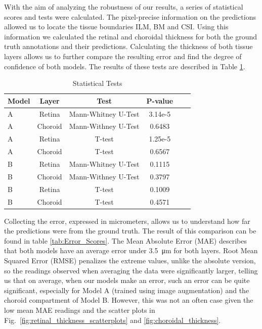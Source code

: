 \documentclass[12pt,a4paper]{scrartcl}
\begin{document}
With the aim of analyzing the robustness of our results, a series of statistical scores and tests were calculated. The pixel-precise information on the predictions allowed us to locate the tissue boundaries ILM, BM and CSI. Using this information we calculated the retinal and choroidal thickness for both the ground truth annotations and their predictions. Calculating the thickness of both tissue layers allows us to further compare the resulting error and find the degree of confidence of both models. The results of these tests are described in Table \ref{tab:statistical_tests}.
\begin{table}[H]
    \begin{tabular}{l c|c|c|c|c}
         \textbf{Model} &\textbf{Layer} & \textbf{Test}& \textbf{P-value}  \\
         \hline
         A & Retina & Mann-Whitney U-Test & 3.14e-5 \\
         A & Choroid & Mann-Withney U-Test & 0.6483 \\
         A & Retina & T-test & 1.25e-5 \\
         A & Choroid & T-test & 0.6567 \\
         B & Retina & Mann-Whitney U-Test & 0.1115 \\
         B & Choroid & Mann-Withney U-Test & 0.3797 \\
         B & Retina & T-test & 0.1009 \\
         B & Choroid & T-test & 0.4571
    \end{tabular}
    \caption{Statistical Tests}
    \label{tab:statistical_tests}
\end{table}

Collecting the error, expressed in micrometers, allows us to understand how far the predictions were from the ground truth. The result of this comparison can be found in table \ref{tab:Error_Scores}. The Mean Absolute Error (MAE) describes that both models have an average error under \SI{3.5}{\micro\metre} for both layers. Root Mean Squared Error (RMSE) penalizes the extreme values, unlike the absolute version, so the readings observed when averaging the data were significantly larger, telling us that on average, when our models make an error, such an error can be quite significant, especially for Model A (trained using image augmentation) and the choroid compartment of Model B. However, this was not an often case given the low mean MAE readings and the scatter plots in Fig.~\ref{fig:retinal_thickness_scatterplots} and \ref{fig:choroidal_thickness}.
\end{document}

